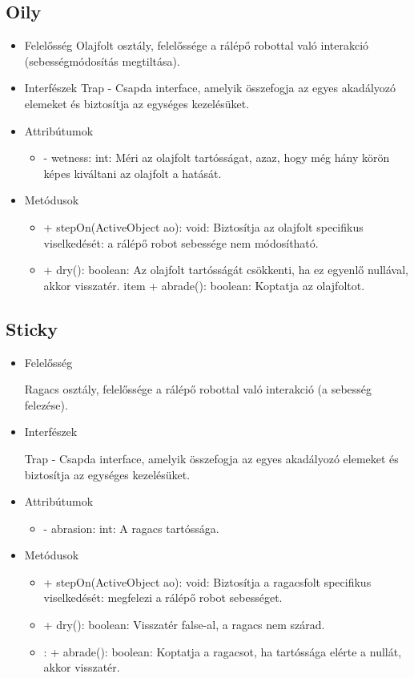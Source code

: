 \subsection{Oily}
\begin{itemize}
	\item Felelősség\newline
	Olajfolt osztály, felelőssége a rálépő robottal való interakció (sebességmódosítás megtiltása).
	\item Interfészek\newline
	Trap  - Csapda interface, amelyik összefogja az egyes akadályozó elemeket és biztosítja az egységes kezelésüket.
	\item Attribútumok
	\begin{itemize}
		\item - wetness: int: Méri az olajfolt tartósságat, azaz, hogy még hány körön képes kiváltani az olajfolt a hatását.
	\end{itemize}
	\item Metódusok
	\begin{itemize}
		\item + stepOn(ActiveObject ao): void: Biztosítja az olajfolt specifikus viselkedését: a rálépő robot sebessége nem módosítható.
		\item + dry(): boolean: Az olajfolt tartósságát csökkenti, ha ez egyenlő nullával, akkor visszatér.
		item + abrade(): boolean: Koptatja az olajfoltot.
	\end{itemize}
\end{itemize}


\subsection{Sticky}
\begin{itemize}
	\item Felelősség
	
	Ragacs osztály, felelőssége a rálépő robottal való interakció (a sebesség felezése).
	\item Interfészek
	
	Trap - Csapda interface, amelyik összefogja az egyes akadályozó elemeket és biztosítja az egységes kezelésüket.
	
	\item Attribútumok
	\begin{itemize}
		\item - abrasion: int: A ragacs tartóssága.
	\end{itemize}

	\item Metódusok
	\begin{itemize}
		\item + stepOn(ActiveObject ao): void: Biztosítja a ragacsfolt specifikus viselkedését: megfelezi a rálépő robot sebességet.
		\item + dry(): boolean: Visszatér false-al, a ragacs nem szárad.
		\item: + abrade(): boolean: Koptatja a ragacsot, ha tartóssága elérte a nullát, akkor visszatér.
	\end{itemize}
\end{itemize}

